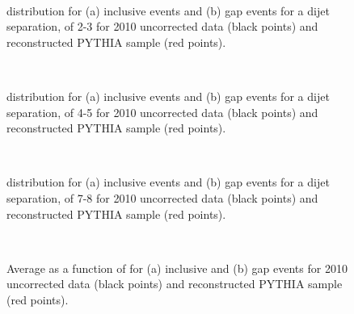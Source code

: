 \begin{figure}
\centering
\mbox{
              \quad
              \quad
                              }
\caption[]{
\dphi{} distribution for (a) inclusive events and (b) gap events for a dijet separation, \dy{} of 2-3 for 2010 uncorrected data (black points) and reconstructed PYTHIA sample (red points).
\label{GBJ2:Uncorr:dphi23}}
\end{figure}


\begin{figure}
\centering
\mbox{
              \quad
              \quad
                              }
\caption[]{
\dphi{} distribution for (a) inclusive events and (b) gap events for a dijet separation, \dy{} of 4-5 for 2010 uncorrected data (black points) and reconstructed PYTHIA sample (red points).
\label{GBJ2:Uncorr:dphi45}}
\end{figure}



\begin{figure}
\centering
\mbox{
              \quad
              \quad
                              }
\caption[]{
\dphi{} distribution for (a) inclusive events and (b) gap events for a dijet separation, \dy{} of 7-8 for 2010 uncorrected data (black points) and reconstructed PYTHIA sample (red points).
\label{GBJ2:Uncorr:dphi78}}
\end{figure}



\begin{figure}
\centering
\mbox{
              \quad
              \quad
                              }
\caption[]{
Average \cosdphi{} as a function of \dy{} for (a) inclusive and (b) gap events for 2010 uncorrected data (black points) and reconstructed PYTHIA sample (red points).
\label{GBJ2:Uncorr:cos}}
\end{figure}


